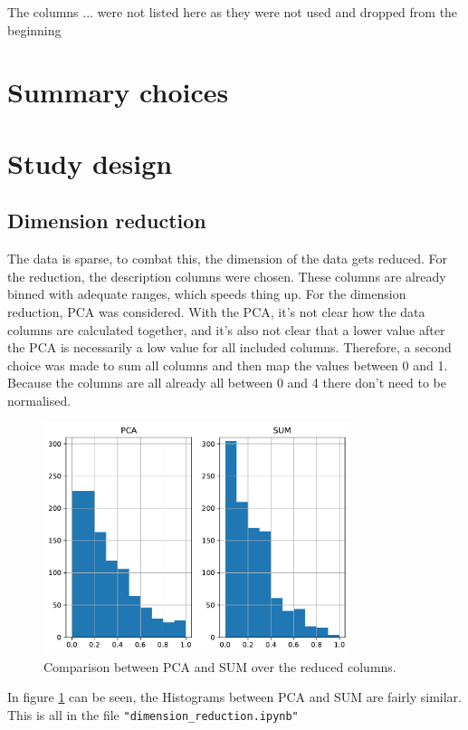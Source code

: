 \documentclass{article}
\newcommand\Plotwidth{0.8}
\begin{document}
The columns ... were not listed here as they were not used and dropped from the beginning

\section{Summary choices}

\section{Study design}

\subsection{Dimension reduction}

The data is sparse, to combat this, the dimension of the data gets reduced. For the reduction, the description columns were chosen. These columns are already binned with adequate ranges, which speeds thing up. For the dimension reduction, PCA was considered. With the PCA, it's not clear how the data columns are calculated together, and it's also not clear that a lower value after the PCA is necessarily a low value for all included columns. Therefore, a second choice was made to sum all columns and then map the values between 0 and 1. Because the columns are all already all between 0 and 4 there don't need to be normalised.

\begin{figure}[h]
    \centering
    \includegraphics[width=\Plotwidth\textwidth]{Plots/PCA_SUM.pdf}
    \caption{Comparison between PCA and SUM over the reduced columns.}
    \label{fig:PCA_SUM}
\end{figure}

In figure \ref{fig:PCA_SUM} can be seen, the Histograms between PCA and SUM are fairly similar. This is all in the file \lstinline{"dimension_reduction.ipynb"}
\end{document}
